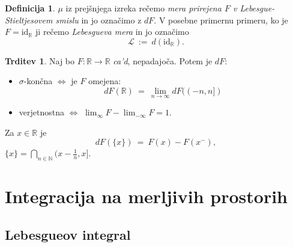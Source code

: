 \documentclass[11pt]{article}
\newcommand{\R}{\mathbb{R}}
\newcommand{\N}{\mathbb{N}}
\newcommand{\LL}{\mathscr{L}}
\newcommand{\set}[1]{\{#1\}}
\newcommand{\1}{\mathbbm{1}}
\newcommand{\id}{\text{id}}
\theoremstyle{definition}
\newtheorem{definicija}{Definicija}[section]
\theoremstyle{definition}
\newtheorem{trditev}{Trditev}[section]
\theoremstyle{definition}
\theoremstyle{definition}
\begin{document}
\begin{definicija}

$\mu$ iz prejšnjega izreka rečemo \textit{mera prirejena $F$ v Lebesgue-Stieltjesovem smislu} in jo označimo z $dF$. V posebne primernu primeru, ko je $F = \id_\R$ ji rečemo \textit{Lebesgueva mera} in jo označimo
$$\LL ~:=~ d(\id_\R).$$

\end{definicija}
\vspace{0.5cm}

\begin{trditev}

Naj bo $F: \R \rightarrow \R$ \textit{ca'd}, nepadajoča. Potem je $dF$:
\begin{itemize}
	\item $\sigma$-končna $\iff$ je $F$ omejena:
	$$dF(\R) ~=~ \lim_{n \rightarrow \infty} dF((-n,n])$$
	\item verjetnostna $\iff$ $\lim_\infty F - \lim_{-\infty} F = 1$.
\end{itemize}
Za $x \in \R$ je 
$$dF(\set{x}) ~=~ F(x) - F(x^-),$$
$\set{x} = \bigcap_{n \in \N} (x - \frac{1}{n}, x]$.

\end{trditev}
\vspace{0.5cm}


\pagebreak


\section{Integracija na merljivih prostorih}
\vspace{0.5cm}


\subsection{Lebesgueov integral}
\vspace{0.5cm}
\end{document}
